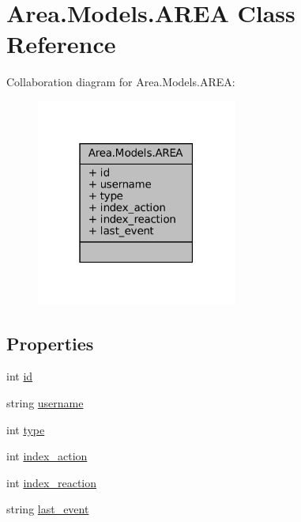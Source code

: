 \hypertarget{classArea_1_1Models_1_1AREA}{}\section{Area.\+Models.\+A\+R\+EA Class Reference}
\label{classArea_1_1Models_1_1AREA}


Collaboration diagram for Area.\+Models.\+A\+R\+EA\+:
\nopagebreak
\begin{figure}[H]
\begin{center}
\leavevmode
\includegraphics[width=187pt]{classArea_1_1Models_1_1AREA__coll__graph}
\end{center}
\end{figure}
\subsection*{Properties}
\begin{DoxyCompactItemize}
\item 
int \mbox{\hyperlink{classArea_1_1Models_1_1AREA_acdb37c953e13ce786f7874a002f7d4c3}{id}}
\item 
string \mbox{\hyperlink{classArea_1_1Models_1_1AREA_ac0f022aa1dd982291b6a25e9c8fd1732}{username}}
\item 
int \mbox{\hyperlink{classArea_1_1Models_1_1AREA_a5dbfb81ef3d8489d0d8ad2f7b0399a3f}{type}}
\item 
int \mbox{\hyperlink{classArea_1_1Models_1_1AREA_a54de1028b1fce5e2691525f41fdf34f6}{index\+\_\+action}}
\item 
int \mbox{\hyperlink{classArea_1_1Models_1_1AREA_a7af867d0050d70d412f932f770fb9f73}{index\+\_\+reaction}}
\item 
string \mbox{\hyperlink{classArea_1_1Models_1_1AREA_aed4dc50ec4a309e0547d67fe378cde38}{last\+\_\+event}}
\end{DoxyCompactItemize}


